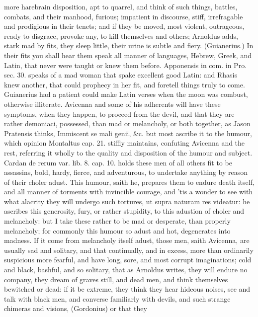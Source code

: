 {more harebrain disposition, apt to quarrel, and think of such things,
battles, combats, and their manhood, furious; impatient in discourse,
stiff, irrefragable and prodigious in their tenets; and if they be
moved, most violent, outrageous, ready to disgrace, provoke any,
to kill themselves and others; Arnoldus adds, stark mad by fits,
they sleep little, their urine is subtle and fiery. (Guianerius.)
In their fits you shall hear them speak all manner of languages,
Hebrew, Greek, and Latin, that never were taught or knew them before.
Apponensis in com. in Pro. sec. 30. speaks of a mad woman that spake
excellent good Latin: and Rhasis knew another, that could prophecy in
her fit, and foretell things truly to come. Guianerius had a
patient could make Latin verses when the moon was combust, otherwise
illiterate. Avicenna and some of his adherents will have these
symptoms, when they happen, to proceed from the devil, and that they
are rather demoniaci, possessed, than mad or melancholy, or both
together, as Jason Pratensis thinks, Immiscent se mali genii, \&c. but
most ascribe it to the humour, which opinion Montaltus cap. 21. stiffly
maintains, confuting Avicenna and the rest, referring it wholly to the
quality and disposition of the humour and subject. Cardan de rerum var.
lib. 8. cap. 10. holds these men of all others fit to be assassins,
bold, hardy, fierce, and adventurous, to undertake anything by reason
of their choler adust. This humour, saith he, prepares them to
endure death itself, and all manner of torments with invincible
courage, and 'tis a wonder to see with what alacrity they will undergo
such tortures, ut supra naturam res videatur: he ascribes this
generosity, fury, or rather stupidity, to this adustion of choler and
melancholy: but I take these rather to be mad or desperate, than
properly melancholy; for commonly this humour so adust and hot,
degenerates into madness.
If it come from melancholy itself adust, those men, saith Avicenna,
 are usually sad and solitary, and that continually, and in
excess, more than ordinarily suspicious more fearful, and have long,
sore, and most corrupt imaginations; cold and black, bashful, and so
solitary, that as Arnoldus writes, they will endure no company,
they dream of graves still, and dead men, and think themselves
bewitched or dead: if it be extreme, they think they hear hideous
noises, see and talk with black men, and converse familiarly with
devils, and such strange chimeras and visions, (Gordonius) or that they
}
